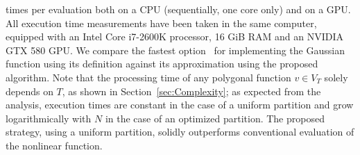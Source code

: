 \documentclass[a4paper,english]{IEEEtran}
\begin{document}
times per evaluation both on a CPU (sequentially, one core only) and
on a GPU. All execution time measurements have been taken in the same
computer, equipped with an Intel Core i7-2600K processor, 16 GiB RAM
and an NVIDIA GTX 580 GPU. We compare the fastest option~\cite{NVIDIACorporation2012}
for implementing the Gaussian function using its definition against
its approximation using the proposed algorithm. Note that the processing
time of any polygonal function $v\in V_{T}$ solely depends on $T$,
as shown in Section~\ref{sec:Complexity}; as expected from the analysis,
execution times are constant in the case of a uniform partition and
grow logarithmically with $N$ in the case of an optimized partition.
The proposed strategy, using a uniform partition, solidly outperforms
conventional evaluation of the nonlinear function.
\end{document}
